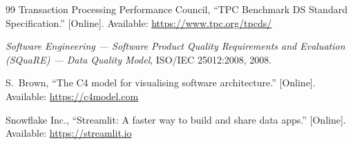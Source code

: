 \documentclass[peerreview]{IEEEtran}
\begin{document}
\begin{thebibliography}{99}
Transaction Processing Performance Council, ``TPC Benchmark DS Standard Specification.''
[Online]. Available: \url{https://www.tpc.org/tpcds/}

\emph{Software Engineering --- Software Product Quality Requirements and Evaluation
(SQuaRE) --- Data Quality Model}, ISO/IEC 25012:2008, 2008.

S.~Brown, ``The C4 model for visualising software architecture.'' [Online]. Available:
\url{https://c4model.com}

Snowflake Inc., ``Streamlit: A faster way to build and share data apps.'' [Online].
Available: \url{https://streamlit.io}

\end{thebibliography}
\end{document}
